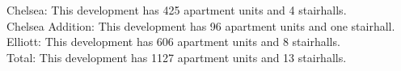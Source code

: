 {Chelsea}: This development has 425 apartment units and 4 stairhalls.\\{Chelsea Addition}: This development has 96 apartment units and one stairhall.\\{Elliott}: This development has 606 apartment units and 8 stairhalls.\\{Total}: This development has 1127 apartment units and 13 stairhalls.\\